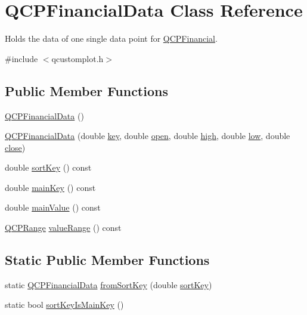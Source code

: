 \hypertarget{class_q_c_p_financial_data}{}\section{Q\+C\+P\+Financial\+Data Class Reference}
\label{class_q_c_p_financial_data}


Holds the data of one single data point for \mbox{\hyperlink{class_q_c_p_financial}{Q\+C\+P\+Financial}}.  




{\ttfamily \#include $<$qcustomplot.\+h$>$}

\subsection*{Public Member Functions}
\begin{DoxyCompactItemize}
\item 
\mbox{\hyperlink{class_q_c_p_financial_data_a1ca53b3a9ae4e9658a4fd1ca57d76ba4}{Q\+C\+P\+Financial\+Data}} ()
\item 
\mbox{\hyperlink{class_q_c_p_financial_data_a069b72c514dfd4fc8e1d5df811e54ca4}{Q\+C\+P\+Financial\+Data}} (double \mbox{\hyperlink{class_q_c_p_financial_data_a18bc92126f28c214b05b0161e5f5958b}{key}}, double \mbox{\hyperlink{class_q_c_p_financial_data_a3059e1e1fbcb9fd243fde0450f238032}{open}}, double \mbox{\hyperlink{class_q_c_p_financial_data_a299a4b241296fb6cd1baf5ab03f7126a}{high}}, double \mbox{\hyperlink{class_q_c_p_financial_data_aecce0fb45a115e3f3a25eea78491ac16}{low}}, double \mbox{\hyperlink{class_q_c_p_financial_data_a45e9b96944c4a08ea6c82a72d3d22df2}{close}})
\item 
double \mbox{\hyperlink{class_q_c_p_financial_data_ab378e8ef6aef482735aba69115cb442e}{sort\+Key}} () const
\item 
double \mbox{\hyperlink{class_q_c_p_financial_data_af6ed6349c65d938fabd2e4dd2cd499ff}{main\+Key}} () const
\item 
double \mbox{\hyperlink{class_q_c_p_financial_data_a65206c76b6f31a57e04dc7da88c9be60}{main\+Value}} () const
\item 
\mbox{\hyperlink{class_q_c_p_range}{Q\+C\+P\+Range}} \mbox{\hyperlink{class_q_c_p_financial_data_a164d5584eeeb9ba48b4b595ac2ac7fcf}{value\+Range}} () const
\end{DoxyCompactItemize}
\subsection*{Static Public Member Functions}
\begin{DoxyCompactItemize}
\item 
static \mbox{\hyperlink{class_q_c_p_financial_data}{Q\+C\+P\+Financial\+Data}} \mbox{\hyperlink{class_q_c_p_financial_data_a54a0ca7ee7fd7713972477e8e2533ce5}{from\+Sort\+Key}} (double \mbox{\hyperlink{class_q_c_p_financial_data_ab378e8ef6aef482735aba69115cb442e}{sort\+Key}})
\item 
static bool \mbox{\hyperlink{class_q_c_p_financial_data_a1121db9420a7694144f6a99b09257a5f}{sort\+Key\+Is\+Main\+Key}} ()
\end{DoxyCompactItemize}
